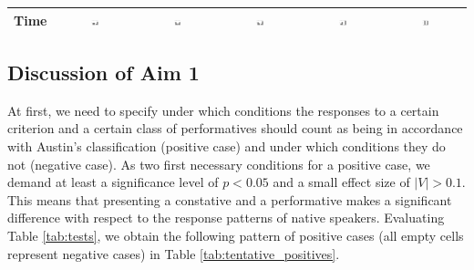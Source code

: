 \documentclass[egregdoesnotlikesansseriftitles,12pt]{scrartcl}
\begin{document}
\begin{landscape}
\begin{table}[]
{\begin{tabular}{lccccc}
Time         & \includegraphics[width=0.1\textwidth]{figures/beha_5.pdf}   & \includegraphics[width=0.1\textwidth]{figures/verd_5.pdf}   & \includegraphics[width=0.1\textwidth]{figures/exer_5.pdf}   & \includegraphics[width=0.1\textwidth]{figures/comm_5.pdf}   & \includegraphics[width=0.1\textwidth]{figures/expo_5.pdf}   \\
\hline
\end{tabular}}
\label{fig:bars}
\end{table}
\end{landscape}


\subsection{Discussion of Aim 1}
At first, we need to specify under which conditions the responses to a certain criterion and a certain class of performatives should count as being in accordance with Austin's classification (positive case) and under which conditions they do not (negative case). As two first necessary conditions for a positive case, we demand at least a significance level of $p<0.05$ and a small effect size of $|V|>0.1$. This means that presenting a constative and a performative makes a significant difference with respect to the response patterns of native speakers. Evaluating Table \ref{tab:tests}, we obtain the following pattern of positive cases (all empty cells represent negative cases) in Table \ref{tab:tentative_positives}.
\end{document}
